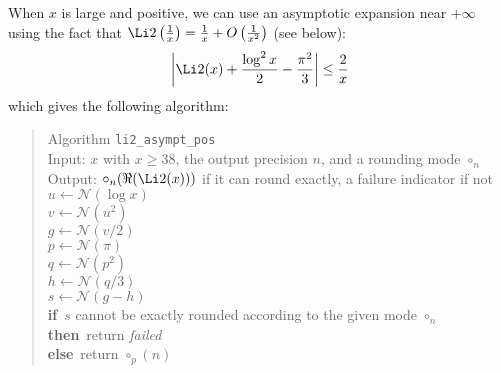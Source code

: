 \documentclass[12pt]{amsart}
\def\N{{\mathcal N}}
\def\If{{\bf if}}
\def\then{{\bf then}}
\def\Else{{\bf else}}
\begin{document}
When $x$ is large and positive, we can use an asymptotic expansion near
$+\infty$ using the fact that 
$\Li2\left(\frac{1}{x}\right) = \frac{1}{x} + O\left(\frac{1}{x^2}\right)$
(see below):
\[
\left|\Li2(x) + \frac{\log^2x}{2} - \frac{\pi^2}{3}\right| \leq \frac{2}{x}
\]
which gives the following algorithm:
\begin{quote}
Algorithm {\tt li2\_asympt\_pos}\\
Input: $x$ with $x \geq 38$, the output precision $n$, and a rounding mode
$\circ_n$ \\
Output: $\circ_n(\Re(\Li2(x)))$ if it can round exactly, a failure indicator
if not\\
$u \leftarrow \N(\log x)$\\
$v \leftarrow \N(u^2)$\\
$g \leftarrow \N(v/2)$\\
$p \leftarrow \N(\pi)$\\
$q \leftarrow \N(p^2)$\\
$h \leftarrow \N(q/3)$\\
$s \leftarrow \N(g-h)$\\
\If\ $s$ cannot be exactly rounded according to the given mode $\circ_n$\\
\then\ return {\em failed}\\
\Else\ return $\circ_p(n)$
\end{quote} 
\end{document}
